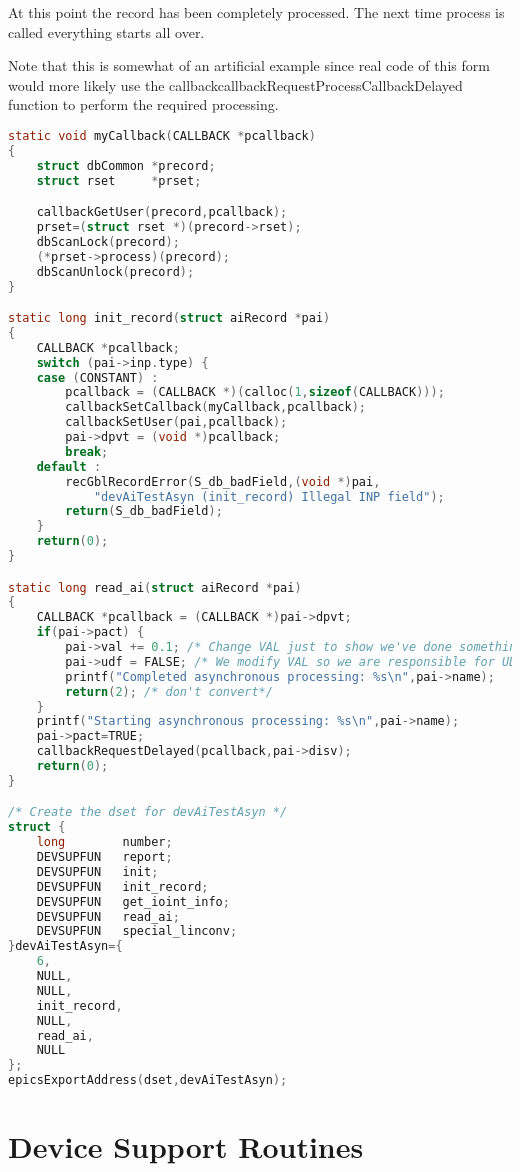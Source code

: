 At this point the record has been completely processed.
The next time process is called everything starts all over.

Note that this is somewhat of an artificial example since real code of this form would more likely use the callbackcallbackRequestProcessCallbackDelayed function to perform the required processing.

\begin{lstlisting}[language=C]
static void myCallback(CALLBACK *pcallback)
{
    struct dbCommon *precord;
    struct rset     *prset;

    callbackGetUser(precord,pcallback);
    prset=(struct rset *)(precord->rset);
    dbScanLock(precord);
    (*prset->process)(precord);
    dbScanUnlock(precord);
}

static long init_record(struct aiRecord *pai)
{
    CALLBACK *pcallback;
    switch (pai->inp.type) {
    case (CONSTANT) :
        pcallback = (CALLBACK *)(calloc(1,sizeof(CALLBACK)));
        callbackSetCallback(myCallback,pcallback);
        callbackSetUser(pai,pcallback);
        pai->dpvt = (void *)pcallback;
        break;
    default :
        recGblRecordError(S_db_badField,(void *)pai,
            "devAiTestAsyn (init_record) Illegal INP field");
        return(S_db_badField);
    }
    return(0);
}

static long read_ai(struct aiRecord *pai)
{
    CALLBACK *pcallback = (CALLBACK *)pai->dpvt;
    if(pai->pact) {
        pai->val += 0.1; /* Change VAL just to show we've done something. */
        pai->udf = FALSE; /* We modify VAL so we are responsible for UDF too. */
        printf("Completed asynchronous processing: %s\n",pai->name);
        return(2); /* don't convert*/
    } 
    printf("Starting asynchronous processing: %s\n",pai->name);
    pai->pact=TRUE;
    callbackRequestDelayed(pcallback,pai->disv);
    return(0);
}

/* Create the dset for devAiTestAsyn */
struct {
    long        number;
    DEVSUPFUN   report;
    DEVSUPFUN   init;
    DEVSUPFUN   init_record;
    DEVSUPFUN   get_ioint_info;
    DEVSUPFUN   read_ai;
    DEVSUPFUN   special_linconv;
}devAiTestAsyn={
    6,
    NULL,
    NULL,
    init_record,
    NULL,
    read_ai,
    NULL
};
epicsExportAddress(dset,devAiTestAsyn);
\end{lstlisting}

\section{Device Support Routines}

